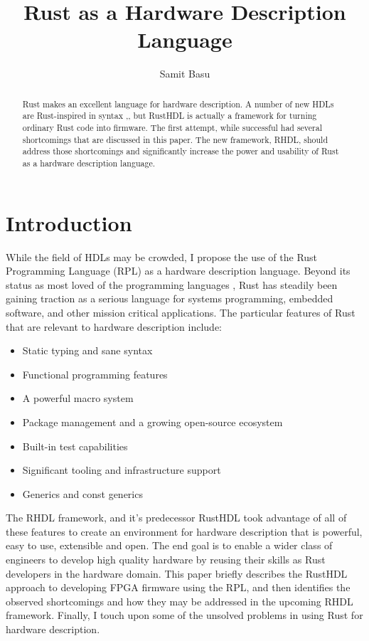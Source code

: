 \documentclass[sigplan,screen,sigconf]{acmart}
\author{Samit Basu}
\affiliation{
  basu.samit@gmail.com
  \country{Fremont CA, USA}
}
\begin{document}
\title{Rust as a Hardware Description Language}

\begin{abstract}
Rust \cite{b9} makes an excellent language for hardware description.  A number of new HDLs are 
Rust-inspired in syntax \cite{b1},\cite{b4},
but RustHDL\cite{b6} is actually a framework for turning ordinary Rust code into firmware.  The first attempt,
while successful had several shortcomings that are discussed in this paper.  The new framework, RHDL\cite{b10},
should address those shortcomings and significantly increase the power and usability of Rust as a
hardware description language.
\end{abstract}

\maketitle

\section{Introduction}

While the field of HDLs may be crowded, I propose the use of the Rust Programming Language (RPL)
as a hardware description language.  Beyond its status as most loved of the programming languages \cite{b0},
Rust has steadily been gaining traction as a serious language for systems programming, embedded 
software, and other mission critical applications.  The particular features of Rust that are 
relevant to hardware description include:
\begin{itemize}
\item Static typing and sane syntax
\item Functional programming features
\item A powerful macro system
\item Package management and a growing open-source ecosystem
\item Built-in test capabilities
\item Significant tooling and infrastructure support
\item Generics and const generics
\end{itemize}
The RHDL framework, and it's predecessor RustHDL took advantage of all of these features to
create an environment for hardware description that is powerful, easy to use, extensible and
open.  The end goal is to enable a wider class of engineers to develop high quality hardware
by reusing their skills as Rust developers in the hardware domain.  This paper briefly describes
the RustHDL approach to developing FPGA firmware using the RPL, and then identifies the
observed shortcomings and how they may be addressed in the upcoming RHDL framework.  
Finally, I touch upon some of the unsolved problems in using Rust for hardware description.
\end{document}

